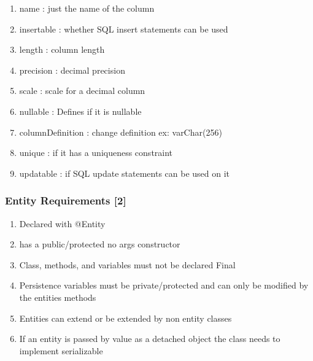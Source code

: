 \documentclass[11pt]{article}
\begin{document}
\begin{enumerate}
\begin{enumerate}
\item name : just the name of the column
\label{sec:orgde2343c}
\item insertable : whether SQL insert statements can be used
\label{sec:org8beba85}
\item length : column length
\label{sec:orgc512c11}
\item precision : decimal precision
\label{sec:org5a0d0e4}
\item scale : scale for a decimal column
\label{sec:org58b0374}
\item nullable : Defines if it is nullable
\label{sec:org8e0b15c}
\item columnDefinition : change definition ex: varChar(256)
\label{sec:org92ee1d8}
\item unique : if it has a uniqueness constraint
\label{sec:org1a1b3e2}
\item updatable : if SQL update statements can be used on it
\label{sec:orga64fdef}
\end{enumerate}
\end{enumerate}

\subsubsection{Entity Requirements [2]}
\label{sec:org0f8d449}
\begin{enumerate}
\item Declared with @Entity
\label{sec:org4b39d84}
\item has a public/protected no args constructor
\label{sec:orgd9479fe}
\item Class, methods, and variables must not be declared Final
\label{sec:orgc7ac2da}
\item Persistence variables must be private/protected and can only be modified by the entities methods
\label{sec:org0ecafd8}
\item Entities can extend or be extended by non entity classes
\label{sec:org1ef536e}
\item If an entity is passed by value as a detached object the class needs to implement serializable
\label{sec:org9255feb}
\end{enumerate}
\end{document}
